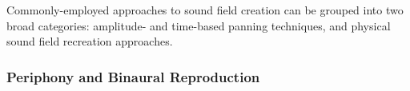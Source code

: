 
%

Commonly-employed approaches to sound field creation can be grouped into two
broad categories: amplitude- and time-based panning techniques, and physical
sound field recreation approaches.

\subsubsection{Periphony and Binaural Reproduction}\label{subsubsec:periphony}

